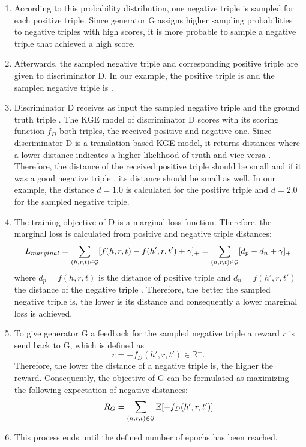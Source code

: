 \begin{enumerate}
    \item
    According to this probability distribution, one negative triple is sampled for each positive triple.
    Since generator G assigns higher sampling probabilities to negative triples with high scores, it is more probable to sample a negative triple that achieved a high score.

    \item 
    Afterwards, the sampled negative triple  and corresponding positive triple  are given to discriminator D.
    In our example, the positive triple is  and the sampled negative triple is .
    
    \item 
    Discriminator D receives as input the sampled negative triple  and the ground truth triple .
    The \ac{KGE} model of discriminator D scores with its scoring function $f_D$ both triples, the received positive and negative one.
    Since discriminator D is a translation-based \ac{KGE} model, it returns distances where a lower distance indicates a higher likelihood of truth and vice versa \cite{cai2017kbgan}.
    Therefore, the distance of the received positive triple  should be small and if it was a good negative triple , its distance should be small as well.
    In our example, the distance $d = 1.0$ is calculated for the positive triple and $d = 2.0$ for the sampled negative triple.
     
    \item 
    The training objective of D is a marginal loss function.
    Therefore, the marginal loss is calculated from positive and negative triple distances:
     \begin{equation}
        L_{marginal}
        =\sum_{(h,r,t)\in\mathcal{G}}[f(h,r,t)-f(h',r,t')+\gamma]_+ 
        = \sum_{(h,r,t)\in\mathcal{G}}[d_p-d_n+\gamma]_+ 
    \end{equation}
    where $d_p = f(h,r,t)$ is the distance of positive triple  and $d_n = f(h',r,t')$ the distance of the negative triple  .
    Therefore, the better the sampled negative triple is, the lower is its distance and consequently a lower marginal loss is achieved.
    
    \item 
    To give generator G a feedback for the sampled negative triple  a reward $r$ is send back to G, which is defined as
    \begin{equation}
        r = -f_D(h',r,t') \in \mathbb{R}^-.
    \end{equation}
    Therefore, the lower the distance of a negative triple is, the higher the reward. 
    Consequently, the objective of G can be formulated as maximizing the following expectation of negative distances:
    \begin{equation}
        R_G=\sum_{(h,r,t)\in\mathcal{G}}\mathbb{E}[-f_D(h',r,t')]
    \end{equation}
    
    \item
    This process ends until the defined number of epochs has been reached.
\end{enumerate}